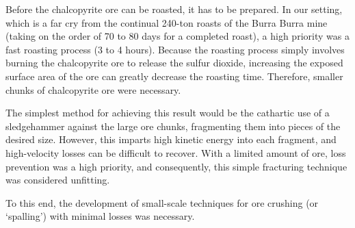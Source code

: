 
Before the chalcopyrite ore can be roasted, it has to be prepared.  In our
setting, which is a far cry from the continual 240-ton roasts of the Burra Burra
mine (taking on the order of 70 to 80 days for a completed roast), a high
priority was a fast roasting process (3 to 4 hours).  Because the roasting
process simply involves burning the chalcopyrite ore to release the sulfur
dioxide, increasing the exposed surface area of the ore can greatly decrease the
roasting time.  Therefore, smaller chunks of chalcopyrite ore were necessary.

The simplest method for achieving this result would be the cathartic use of a
sledgehammer against the large ore chunks, fragmenting them into pieces of the
desired size.  However, this imparts high kinetic energy into each fragment, and
high-velocity losses can be difficult to recover.  With a limited amount of ore,
loss prevention was a high priority, and consequently, this simple fracturing
technique was considered unfitting.

To this end, the development of small-scale techniques for ore crushing (or
`spalling') with minimal losses was necessary.
